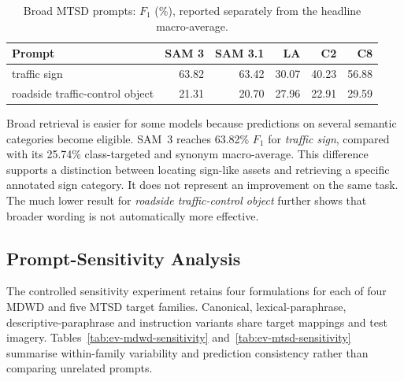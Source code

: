 \begin{table}[htbp]
\centering
\small
\caption{Broad \gls{MTSD} prompts: $F_1$ (\%), reported separately from the headline macro-average.}
\label{tab:ev-mtsd-broad}
\renewcommand{\arraystretch}{1.15}
\begin{tabularx}{\textwidth}{@{}>{\raggedright\arraybackslash}Xrrrrr@{}}
\toprule
Prompt & SAM 3 & SAM 3.1 & LA & C2 & C8 \\
\midrule
traffic sign & 63.82 & 63.42 & 30.07 & 40.23 & 56.88 \\
roadside traffic-control object & 21.31 & 20.70 & 27.96 & 22.91 & 29.59 \\
\bottomrule
\end{tabularx}
\end{table}


Broad retrieval is easier for some models because predictions on several semantic categories become eligible. SAM~3 reaches 63.82\% \(F_1\) for \emph{traffic sign}, compared with its 25.74\% class-targeted and synonym macro-average. This difference supports a distinction between locating sign-like assets and retrieving a specific annotated sign category. It does not represent an improvement on the same task. The much lower result for \emph{roadside traffic-control object} further shows that broader wording is not automatically more effective.

\subsection{Prompt-Sensitivity Analysis}
\label{sec:ev-sensitivity}
The controlled sensitivity experiment retains four formulations for each of four \gls{MDWD} and five \gls{MTSD} target families. Canonical, lexical-paraphrase, descriptive-paraphrase and instruction variants share target mappings and test imagery. Tables~\ref{tab:ev-mdwd-sensitivity} and~\ref{tab:ev-mtsd-sensitivity} summarise within-family variability and prediction consistency rather than comparing unrelated prompts.

